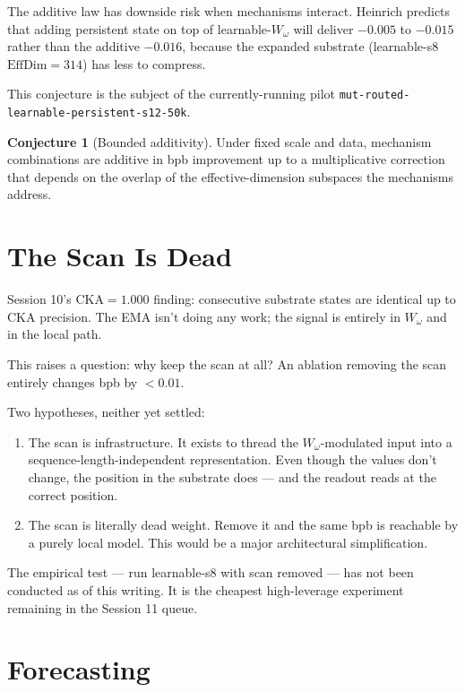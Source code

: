\documentclass[11pt,openany]{book}
\theoremstyle{definition}
\newtheorem{conjecture}{Conjecture}[chapter]
\theoremstyle{plain}
\newcommand{\effdim}{\mathrm{EffDim}}
\newcommand{\cka}{\mathrm{CKA}}
\newcommand{\omegaproj}{W_\omega}
\begin{document}
The additive law has downside risk when mechanisms interact. Heinrich
predicts that adding persistent state on top of learnable-$\omegaproj$
will deliver $-0.005$ to $-0.015$ rather than the additive $-0.016$,
because the expanded substrate (learnable-s8 $\effdim = 314$) has less
to compress.

This conjecture is the subject of the currently-running pilot
\texttt{mut-routed-learnable-persistent-s12-50k}.

\begin{conjecture}[Bounded additivity]
Under fixed scale and data, mechanism combinations are additive in bpb
improvement up to a multiplicative correction that depends on the
overlap of the effective-dimension subspaces the mechanisms address.
\end{conjecture}

\chapter{The Scan Is Dead}

Session 10's $\cka = 1.000$ finding: consecutive substrate states are
identical up to CKA precision. The EMA isn't doing any work; the
signal is entirely in $\omegaproj$ and in the local path.

This raises a question: why keep the scan at all? An ablation removing
the scan entirely changes bpb by $< 0.01$.

Two hypotheses, neither yet settled:
\begin{enumerate}
  \item The scan is infrastructure. It exists to thread the
    $\omegaproj$-modulated input into a sequence-length-independent
    representation. Even though the values don't change, the position
    in the substrate does --- and the readout reads at the correct
    position.
  \item The scan is literally dead weight. Remove it and the same
    bpb is reachable by a purely local model. This would be a major
    architectural simplification.
\end{enumerate}

The empirical test --- run learnable-s8 with scan removed ---
has not been conducted as of this writing. It is the cheapest
high-leverage experiment remaining in the Session 11 queue.

\chapter{Forecasting}
\end{document}
